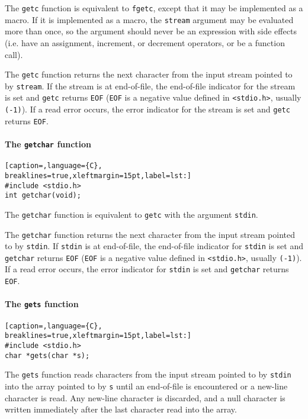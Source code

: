 The \texttt{getc} function is equivalent to \texttt{fgetc}, except that it may
be implemented as a macro. If it is implemented as a macro, the \texttt{stream}
argument may be evaluated more than once, so the argument should never be an
expression with side effects (i.e. have an assignment, increment, or decrement
operators, or be a function call).

The \texttt{getc} function returns the next character from the input stream
pointed to by \texttt{stream}. If the stream is at end-of-file, the end-of-file
indicator for the stream is set and \texttt{getc} returns \texttt{EOF}
(\texttt{EOF} is a negative value defined in
\texttt{\textless{}stdio.h\textgreater{}}, usually \texttt{(-1)}). If a read
error occurs, the error indicator for the stream is set and \texttt{getc}
returns \texttt{EOF}.

\paragraph{The \texttt{getchar} function}
\lstset{basicstyle=\scriptsize, numbers=left, captionpos=b, tabsize=4}
\begin{lstlisting}[caption=,language={C},
breaklines=true,xleftmargin=15pt,label=lst:]
#include <stdio.h>
int getchar(void);
\end{lstlisting}

The \texttt{getchar} function is equivalent to \texttt{getc} with the argument
\texttt{stdin}.

The \texttt{getchar} function returns the next character from the input stream
pointed to by \texttt{stdin}. If \texttt{stdin} is at end-of-file, the
end-of-file indicator for \texttt{stdin} is set and \texttt{getchar} returns
\texttt{EOF} (\texttt{EOF} is a negative value defined in
\texttt{\textless{}stdio.h\textgreater{}}, usually \texttt{(-1)}). If a read
error occurs, the error indicator for \texttt{stdin} is set and
\texttt{getchar} returns \texttt{EOF}.

\paragraph{The \texttt{gets} function}
\lstset{basicstyle=\scriptsize, numbers=left, captionpos=b, tabsize=4}
\begin{lstlisting}[caption=,language={C},
breaklines=true,xleftmargin=15pt,label=lst:]
#include <stdio.h>
char *gets(char *s);
\end{lstlisting}

The \texttt{gets} function reads characters from the input stream pointed to by
\texttt{stdin} into the array pointed to by \texttt{s} until an end-of-file is
encountered or a new-line character is read. Any new-line character is
discarded, and a null character is written immediately after the last character
read into the array.

